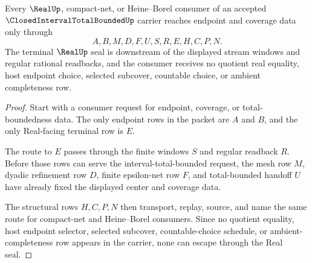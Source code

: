 \begin{theorem}
\label{thm:closed-interval-total-bounded-real-seal-nonescape}
Every $\RealUp$, compact-net, or Heine--Borel consumer of an accepted $\ClosedIntervalTotalBoundedUp$ carrier reaches endpoint and coverage data only through
$$
A,B,M,D,F,U,S,R,E,H,C,P,N .
$$
The terminal $\RealUp$ seal is downstream of the displayed stream windows and regular rational readbacks, and the consumer receives no quotient real equality, host endpoint choice, selected subcover, countable choice, or ambient completeness row.
\end{theorem}
\begin{proof}
Start with a consumer request for endpoint, coverage, or total-boundedness data. The only endpoint rows in the packet are $A$ and $B$, and the only Real-facing terminal row is $E$.

The route to $E$ passes through the finite windows $S$ and regular readback $R$. Before those rows can serve the interval-total-bounded request, the mesh row $M$, dyadic refinement row $D$, finite epsilon-net row $F$, and total-bounded handoff $U$ have already fixed the displayed center and coverage data.

The structural rows $H,C,P,N$ then transport, replay, source, and name the same route for compact-net and Heine--Borel consumers. Since no quotient equality, host endpoint selector, selected subcover, countable-choice schedule, or ambient-completeness row appears in the carrier, none can escape through the Real seal.
\end{proof}


